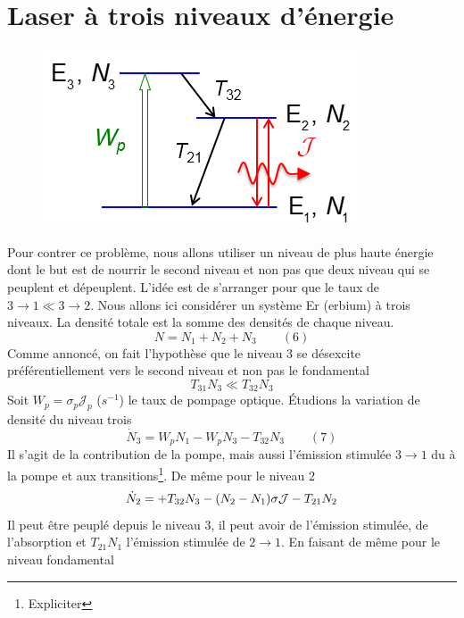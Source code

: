 \section{Laser à trois niveaux d'énergie}
	\begin{figure}
	\vspace{-5mm}
	\includegraphics[scale=0.6]{ch4/image5.png}
	\end{figure}
Pour contrer ce problème, nous allons utiliser un niveau de plus haute énergie dont le but est de 
nourrir le second niveau et non pas que deux niveau qui se peuplent et dépeuplent. L'idée est de 
s'arranger pour que le taux de $3\to1 \ll 3\to 2$. Nous allons ici considérer un système Er (erbium) 
à trois niveaux. La densité totale est la somme des densités de chaque niveau.
\begin{equation}
N= N_1+N_2+N_3\qquad (6)
\end{equation}
Comme annoncé, on fait l'hypothèse que le niveau 3 se désexcite préférentiellement vers le second 
niveau et non pas le fondamental
\begin{equation}
T_{31}N_3 \ll T_{32}N_3
\end{equation}
Soit $W_p=\sigma_p\mathcal{J}_p$ ($s^{-1}$) le taux de pompage optique. Étudions la variation de 
densité du niveau trois
\begin{equation}
{\dot N_3} = {W_p}{N_1} - {W_p}{N_3} - {T_{32}}{N_3}\qquad(7)
\end{equation}
Il s'agit de la contribution de la pompe, mais aussi l'émission stimulée $3\to1$ du à la pompe et 
aux transitions\footnote{Expliciter}. De même pour le niveau 2
\begin{equation}
{\dot N_2} =  + {T_{32}}{N_3} - ({N_2} - {N_1})\sigma {{\cal J}} - {T_{21}}{N_2}
\end{equation}
Il peut être peuplé depuis le niveau 3, il peut avoir de l'émission stimulée, de l'absorption et 
$T_{21}N_1$ l'émission stimulée de $2\to1$. En faisant de même pour le niveau fondamental
